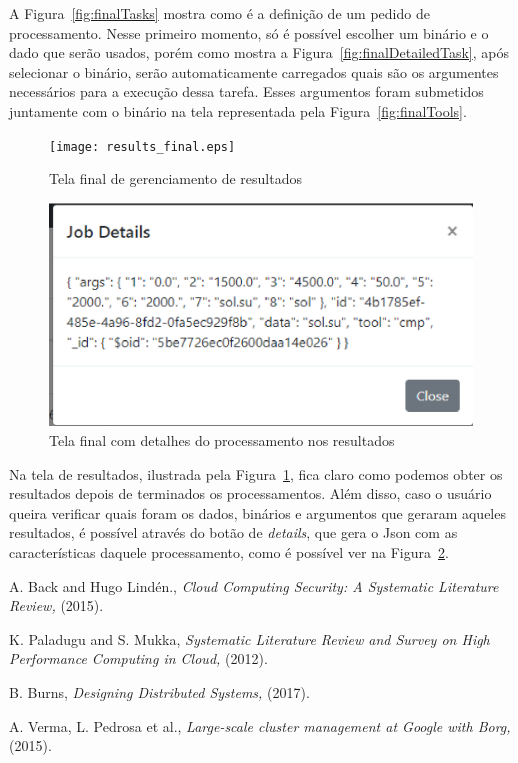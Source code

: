 \documentclass[11pt,twoside]{article}
\begin{document}
A Figura~\ref{fig:finalTasks} mostra como é a definição de um pedido de processamento. Nesse primeiro momento, só é possível escolher um binário e o dado que serão usados, porém como mostra 
a Figura~\ref{fig:finalDetailedTask}, após selecionar o binário, serão automaticamente carregados quais são os argumentes necessários para a execução dessa tarefa. Esses argumentos
foram submetidos juntamente com o binário na tela representada pela Figura~\ref{fig:finalTools}.

\begin{figure}[!h]
  \centering
  \texttt{[image: results\_final.eps]}
  \caption{Tela final de gerenciamento de resultados}
  \label{fig:finalResults}
\end{figure}

\begin{figure}[!h]
  \centering
  \includegraphics[scale=0.6]{results_detail_final.eps}
  \caption{Tela final com detalhes do processamento nos resultados}
  \label{fig:finalResultsDetail}
\end{figure}

Na tela de resultados, ilustrada pela Figura~\ref{fig:finalResults}, fica claro como podemos obter os resultados depois de terminados os processamentos. Além disso, caso o usuário queira verificar 
quais foram os dados, binários e argumentos que geraram aqueles resultados, é possível através do botão de \emph{details}, que gera o Json com as características daquele processamento, como é possível ver na 
Figura~\ref{fig:finalResultsDetail}.

\begin{thebibliography}{99}

 A. Back and Hugo Lindén., {\it Cloud Computing Security: A Systematic Literature Review,} (2015).

 K. Paladugu and S. Mukka, {\it Systematic Literature Review and Survey on High Performance Computing in Cloud,} (2012).

 B. Burns, {\it Designing Distributed Systems,} (2017).

 A. Verma, L. Pedrosa  et al., {\it Large-scale cluster management at Google with Borg,} (2015).

\end{thebibliography}
\end{document}
